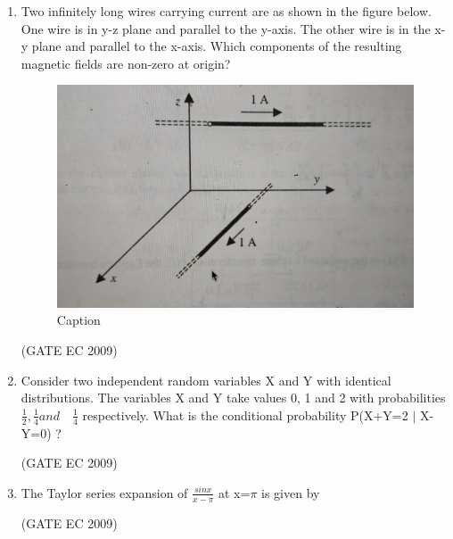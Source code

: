 \documentclass[journal,12pt,onecolumn]{IEEEtran}
\theoremstyle{remark}
\begin{document}
\begin{enumerate}[start=1, label={Q\arabic*.}]
\item Two infinitely long wires carrying current are as shown in the figure below. One wire is in y-z plane and parallel to the y-axis. The other wire is in the x-y plane and parallel to the x-axis. Which components of the resulting magnetic fields are non-zero at origin?
\begin{figure}[H]
    \centering
    \includegraphics[width=0.5\linewidth]{images/img_8.jpg}
    \caption{Caption}
    \label{fig:placeholder}
\end{figure}
\begin{enumerate}
\end{enumerate}
\hfill (GATE EC 2009)
\item Consider two independent random variables X and Y with identical distributions. The variables X and Y take values 0, 1 and 2 with probabilities $\frac{1}{2}, \frac{1}{4} and  \quad \frac{1}{4}$ respectively. What is the conditional probability P(X+Y=2 $|$ X-Y=0) ?

\begin{enumerate}[label=(\Alph*)]
\end{enumerate}
\hfill (GATE EC 2009)

\item The Taylor series expansion of $\frac{sinx}{x-\pi}$ at x=$\pi$ is given by

\begin{enumerate}[label=(\Alph*)]
\end{enumerate}
\hfill (GATE EC 2009)


\end{enumerate}
\end{document}
